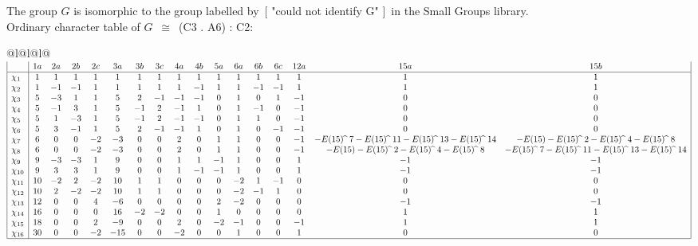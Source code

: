 \documentclass[varwidth=\maxdimen,border=10]{standalone}
\begin{document}
The group $G$ is isomorphic to the group labelled by\ [ "could not identify G" ]\ in the Small Groups library.\\
Ordinary character table of $G$\ $\cong$\ (C3 . A6) : C2:\\
\begin{center}
\begin{tabular}{@{}l@{}l@{}l@{}}
\hline
\(\begin{array}{|l|cccccccccccccccc|}
  & 1a & 2a & 2b & 2c & 3a & 3b & 3c & 4a & 4b & 5a & 6a & 6b & 6c & 12a & 15a & 15b\\ \hline
\chi_{1} & 1 & 1 & 1 & 1 & 1 & 1 & 1 & 1 & 1 & 1 & 1 & 1 & 1 & 1 & 1 & 1\\
\chi_{2} & 1 & -1 & -1 & 1 & 1 & 1 & 1 & 1 & -1 & 1 & 1 & -1 & -1 & 1 & 1 & 1\\
\chi_{3} & 5 & -3 & 1 & 1 & 5 & 2 & -1 & -1 & -1 & 0 & 1 & 0 & 1 & -1 & 0 & 0\\
\chi_{4} & 5 & -1 & 3 & 1 & 5 & -1 & 2 & -1 & 1 & 0 & 1 & -1 & 0 & -1 & 0 & 0\\
\chi_{5} & 5 & 1 & -3 & 1 & 5 & -1 & 2 & -1 & -1 & 0 & 1 & 1 & 0 & -1 & 0 & 0\\
\chi_{6} & 5 & 3 & -1 & 1 & 5 & 2 & -1 & -1 & 1 & 0 & 1 & 0 & -1 & -1 & 0 & 0\\
\chi_{7} & 6 & 0 & 0 & -2 & -3 & 0 & 0 & 2 & 0 & 1 & 1 & 0 & 0 & -1 & -E(15) \widehat{\ }\ {7}-E(15) \widehat{\ }\ {11}-E(15) \widehat{\ }\ {13}-E(15) \widehat{\ }\ {14} & -E(15)-E(15) \widehat{\ }\ {2}-E(15) \widehat{\ }\ {4}-E(15) \widehat{\ }\ {8}\\
\chi_{8} & 6 & 0 & 0 & -2 & -3 & 0 & 0 & 2 & 0 & 1 & 1 & 0 & 0 & -1 & -E(15)-E(15) \widehat{\ }\ {2}-E(15) \widehat{\ }\ {4}-E(15) \widehat{\ }\ {8} & -E(15) \widehat{\ }\ {7}-E(15) \widehat{\ }\ {11}-E(15) \widehat{\ }\ {13}-E(15) \widehat{\ }\ {14}\\
\chi_{9} & 9 & -3 & -3 & 1 & 9 & 0 & 0 & 1 & 1 & -1 & 1 & 0 & 0 & 1 & -1 & -1\\
\chi_{10} & 9 & 3 & 3 & 1 & 9 & 0 & 0 & 1 & -1 & -1 & 1 & 0 & 0 & 1 & -1 & -1\\
\chi_{11} & 10 & -2 & 2 & -2 & 10 & 1 & 1 & 0 & 0 & 0 & -2 & 1 & -1 & 0 & 0 & 0\\
\chi_{12} & 10 & 2 & -2 & -2 & 10 & 1 & 1 & 0 & 0 & 0 & -2 & -1 & 1 & 0 & 0 & 0\\
\chi_{13} & 12 & 0 & 0 & 4 & -6 & 0 & 0 & 0 & 0 & 2 & -2 & 0 & 0 & 0 & -1 & -1\\
\chi_{14} & 16 & 0 & 0 & 0 & 16 & -2 & -2 & 0 & 0 & 1 & 0 & 0 & 0 & 0 & 1 & 1\\
\chi_{15} & 18 & 0 & 0 & 2 & -9 & 0 & 0 & 2 & 0 & -2 & -1 & 0 & 0 & -1 & 1 & 1\\
\chi_{16} & 30 & 0 & 0 & -2 & -15 & 0 & 0 & -2 & 0 & 0 & 1 & 0 & 0 & 1 & 0 & 0\\
\hline
\end{array}\)\\
\end{tabular}
\end{center}
\end{document}
